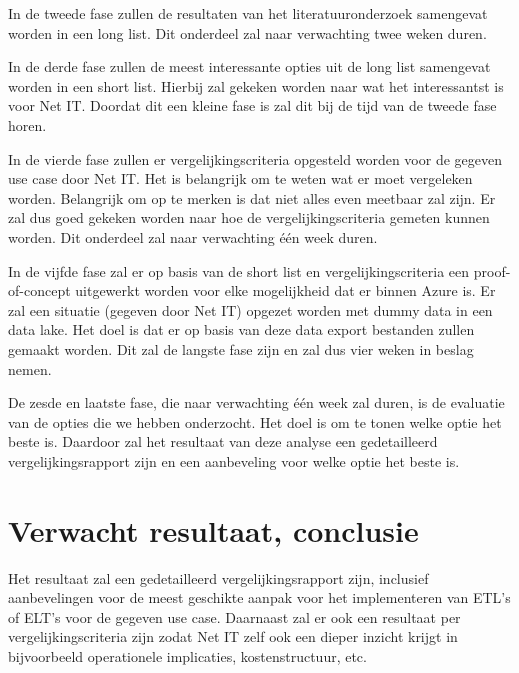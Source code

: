 In de tweede fase zullen de resultaten van het literatuuronderzoek samengevat worden in een long list. Dit onderdeel zal naar verwachting twee weken duren.

In de derde fase zullen de meest interessante opties uit de long list samengevat worden in een short list. Hierbij zal gekeken worden naar wat het interessantst is voor Net IT. Doordat dit een kleine fase is zal dit bij de tijd van de tweede fase horen.

In de vierde fase zullen er vergelijkingscriteria opgesteld worden voor de gegeven use case door Net IT. Het is belangrijk om te weten wat er moet vergeleken worden. Belangrijk om op te merken is dat niet alles even meetbaar zal zijn. Er zal dus goed gekeken worden naar hoe de vergelijkingscriteria gemeten kunnen worden. Dit onderdeel zal naar verwachting één week duren.

In de vijfde fase zal er op basis van de short list en vergelijkingscriteria een proof-of-concept uitgewerkt worden voor elke mogelijkheid dat er binnen Azure is. Er zal een situatie (gegeven door Net IT) opgezet worden met dummy data in een data lake. Het doel is dat er op basis van deze data export bestanden zullen gemaakt worden. Dit zal de langste fase zijn en zal dus vier weken in beslag nemen.

De zesde en laatste fase, die naar verwachting één week zal duren, is de evaluatie van de opties die we hebben onderzocht. Het doel is om te tonen welke optie het beste is. Daardoor zal het resultaat van deze analyse een gedetailleerd vergelijkingsrapport zijn en een aanbeveling voor welke optie het beste is.


\section{Verwacht resultaat, conclusie}%
\label{sec:verwachte_resultaten}

Het resultaat zal een gedetailleerd vergelijkingsrapport zijn, inclusief aanbevelingen voor de meest geschikte aanpak voor het implementeren van ETL's of ELT's voor de gegeven use case. Daarnaast zal er ook een resultaat per vergelijkingscriteria zijn zodat Net IT zelf ook een dieper inzicht krijgt in bijvoorbeeld operationele implicaties, kostenstructuur, etc.
